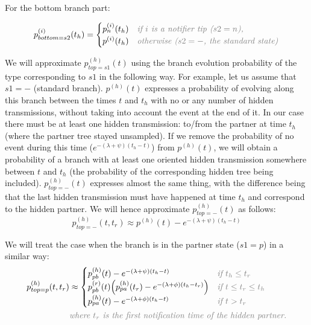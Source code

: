 \documentclass[10pt,letterpaper]{article}
\begin{document}
For the bottom branch part: 

\begin{equation}
p_{bottom=s2}^{(i)}(t_h) = 
\begin{cases}
p_n^{(i)}(t_h)&\textit{\color{gray} if $i$ is a notifier tip ($s2=n$),}\\
p^{(i)}(t_h)&\textit{\color{gray} otherwise ($s2=-$, the standard state)}\\
\end{cases}
\end{equation}

We will approximate $p_{top=s1}^{(h)}(t)$ using the branch evolution probability of the type corresponding to $s1$  in the following way. For example, let us assume that $s1=-$ (standard branch). $p^{(h)}(t)$ expresses a probability of evolving along this branch between the times $t$ and $t_h$ with no or any number of hidden transmissions, without taking into account the event at the end of it. In our case there must be at least one hidden transmission: to/from the partner at time $t_h$ (where the partner tree stayed unsampled). If we remove the probability of no event during this time ($e^{-(\lambda + \psi)(t_h - t)}$) from $p^{(h)}(t)$, we will obtain a probability of a branch with at least one oriented hidden transmission somewhere between $t$ and $t_h$ (the probability of the corresponding hidden tree being included). $p_{top=-}^{(h)}(t)$ expresses almost the same thing, with the difference being that the last hidden transmission must have happened at time $t_h$ and correspond to the hidden partner. %
We will hence approximate $p_{top=-}^{(h)}(t)$ as follows: 
\begin{equation}
p_{top=-}^{(h)}(t, t_r) \approx p^{(h)}(t) -e^{-(\lambda + \psi)(t_{h} - t)}
\end{equation}

We will treat the case when the branch is in the partner state ($s1=p$) in a similar way:
\begin{equation}
\begin{split}
p_{top=p}^{(h)}(t, t_r) &\approx 
\begin{cases}
p_{pb}^{(h)}(t) -e^{-(\lambda + \psi)(t_{h} - t)}&\textit{\color{gray} if $t_h \leq t_r$}\\
p_{pb}^{(r)}(t)\Big(p_{pa}^{(h)}(t_r) -e^{-(\lambda + \phi)(t_{h} - t_r)}\Big)&\textit{\color{gray} if $t \leq t_r \leq t_h$}\\
p_{pa}^{(h)}(t) -e^{-(\lambda + \phi)(t_{h} - t)}&\textit{\color{gray} if $t > t_r$}\\
\end{cases}\\
&\textit{\color{gray}where $t_r$ is the first notification time of the hidden partner.}\\
\end{split}
\end{equation}
\end{document}
